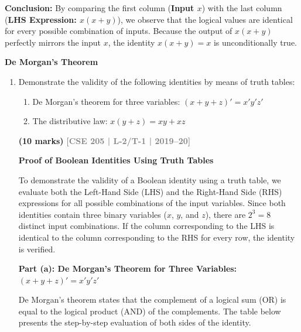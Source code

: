 \documentclass[12pt,a3paper]{article}
\newcommand{\yr}[1]{\hfill\textcolor{gray}{\small\textbf{[#1]}}}
\newcommand{\mk}[1]{\textcolor{orange!70!black}{\small\textbf{(#1 marks)}}}
\newcommand{\subtopic}[2]{%
  \vspace{10pt}
  \noindent\begin{tcolorbox}[colback=#1!8,colframe=#1,boxrule=0.6pt,arc=4pt,
    left=6pt,right=6pt,top=4pt,bottom=4pt]
    \small\bfseries\textcolor{#1}{#2}
  \end{tcolorbox}
  \vspace{2pt}
}
\begin{document}
\begin{enumerate}
\begin{tcolorbox}[enhanced,breakable,ansbox,colback=cA!4,colframe=cA,boxrule=0.8pt,arc=5pt,title={\textbf{Answer}},fonttitle=\bfseries\color{white},colbacktitle=cA]
\vspace{0.2cm}
\textbf{Conclusion:} 
By comparing the first column (\textbf{Input $x$}) with the last column (\textbf{LHS Expression: $x(x + y)$}), we observe that the logical values are identical for every possible combination of inputs. Because the output of $x(x+y)$ perfectly mirrors the input $x$, the identity $x(x + y) = x$ is unconditionally true.

\end{tcolorbox}

\end{enumerate}

\subtopic{cA}{De Morgan's Theorem}
\label{sub:s1-demorgan}

\begin{enumerate}

\item Demonstrate the validity of the following identities by means of truth tables:
\begin{enumerate}
  \item De Morgan's theorem for three variables: $(x + y + z)' = x'y'z'$
  \item The distributive law: $x(y + z) = xy + xz$
\end{enumerate}
\mk{10} \yr{CSE 205 | L-2/T-1 | 2019--20}

\begin{tcolorbox}[enhanced,breakable,ansbox,colback=cA!4,colframe=cA,boxrule=0.8pt,arc=5pt,title={\textbf{Answer}},fonttitle=\bfseries\color{white},colbacktitle=cA]

\textbf{Proof of Boolean Identities Using Truth Tables}

To demonstrate the validity of a Boolean identity using a truth table, we evaluate both the Left-Hand Side (LHS) and the Right-Hand Side (RHS) expressions for all possible combinations of the input variables. Since both identities contain three binary variables ($x$, $y$, and $z$), there are $2^3 = 8$ distinct input combinations. If the column corresponding to the LHS is identical to the column corresponding to the RHS for every row, the identity is verified.

\vspace{0.4cm}
\textbf{Part (a): De Morgan's Theorem for Three Variables: $(x + y + z)' = x'y'z'$}

De Morgan's theorem states that the complement of a logical sum (OR) is equal to the logical product (AND) of the complements. The table below presents the step-by-step evaluation of both sides of the identity.


\end{tcolorbox}
\end{enumerate}
\end{document}

